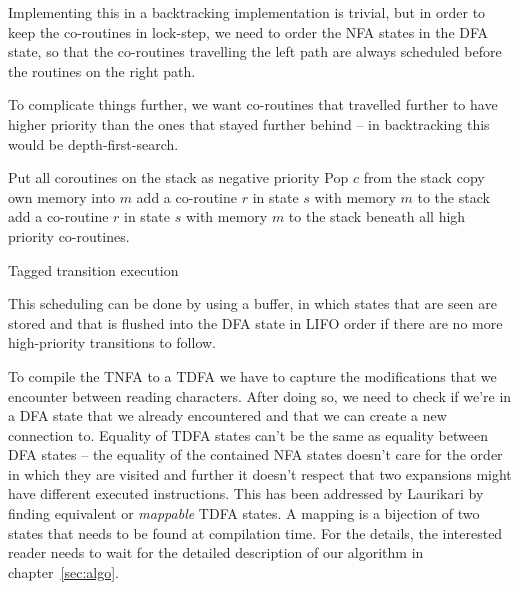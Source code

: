\documentclass[11pt,a4paper,twoside,openright]{Thesis}
\theoremstyle{definition}
\begin{document}
Implementing this in a backtracking implementation is trivial, but in order
to keep the co-routines in lock-step, we need to order the NFA states in the
DFA state, so that the co-routines travelling the left path are always
scheduled before the routines on the right path.

To complicate things further, we want co-routines that travelled further to 
have higher priority than the ones that stayed further behind -- in 
backtracking this would be depth-first-search.

\begin{algorithm*}
  \begin{algorithmic}
    \State Put all coroutines on the stack as negative priority
      \State Pop $c$ from the stack
          \State copy own memory into $m$
          \State {}
        \EndIf
          \State add a co-routine $r$ in state $s$ with memory $m$ to the stack
        \Else
          \State add a co-routine $r$ in state $s$ with memory $m$ to the 
          stack beneath all high priority co-routines.
        \EndIf
      \EndFor
    \EndWhile
  \EndFunction
  \end{algorithmic}
  \caption{\label{alg:coroutine-tagged}Tagged transition execution}
\end{algorithm*}

This scheduling can be done by using a buffer, in which states that are seen 
are stored and that is flushed into the DFA state in LIFO order if there are no
more high-priority transitions to follow.

To compile the TNFA to a TDFA we have to capture the modifications that we 
encounter between reading characters. After doing so, we need to check if 
we're in a DFA state that we already encountered and that we can create a new 
connection to. Equality of TDFA states can't be the same as equality between 
DFA states -- the equality of the contained NFA states doesn't care for the 
order in which they are visited and further it doesn't respect that two 
expansions might have different executed instructions. This has been addressed
by Laurikari\cite{Laur00a} by finding equivalent or \emph{mappable} TDFA
states. A mapping is a bijection of two states that needs to be found at
compilation time. For the details, the interested reader needs to wait for the
detailed description of our algorithm in chapter~\ref{sec:algo}.
\end{document}
